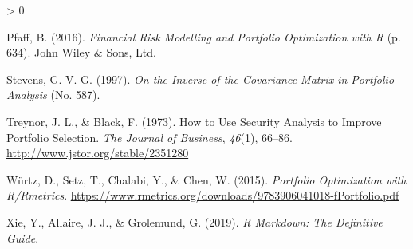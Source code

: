 \documentclass[
  11pt,
]{article}
\newlength{\cslhangindent}
\newenvironment{CSLReferences}[2] %
 {%
  \setlength{\parindent}{0pt}
  \ifodd #1 \everypar{\setlength{\hangindent}{\cslhangindent}}\ignorespaces\fi
  \ifnum #2 > 0
  \setlength{\parskip}{#2\baselineskip}
  \fi
 }%
 {}
\begin{document}
\begin{CSLReferences}{1}{0}
\leavevmode\hypertarget{ref-Pfaff2016}{}%
Pfaff, B. (2016). \emph{{Financial Risk Modelling and Portfolio
Optimization with R}} (p. 634). John Wiley \& Sons, Ltd.

\leavevmode\hypertarget{ref-Ste1997}{}%
Stevens, G. V. G. (1997). \emph{{On the Inverse of the Covariance Matrix
in Portfolio Analysis}} (No. 587).

\leavevmode\hypertarget{ref-Treynor1973}{}%
Treynor, J. L., \& Black, F. (1973). {How to Use Security Analysis to
Improve Portfolio Selection}. \emph{The Journal of Business},
\emph{46}(1), 66--86. \url{http://www.jstor.org/stable/2351280}

\leavevmode\hypertarget{ref-Wurtz2015}{}%
Würtz, D., Setz, T., Chalabi, Y., \& Chen, W. (2015). \emph{{Portfolio
Optimization with R/Rmetrics}}.
\url{https://www.rmetrics.org/downloads/9783906041018-fPortfolio.pdf}

\leavevmode\hypertarget{ref-Xie2019}{}%
Xie, Y., Allaire, J. J., \& Grolemund, G. (2019). \emph{{R Markdown: The
Definitive Guide}}.

\end{CSLReferences}
\end{document}
